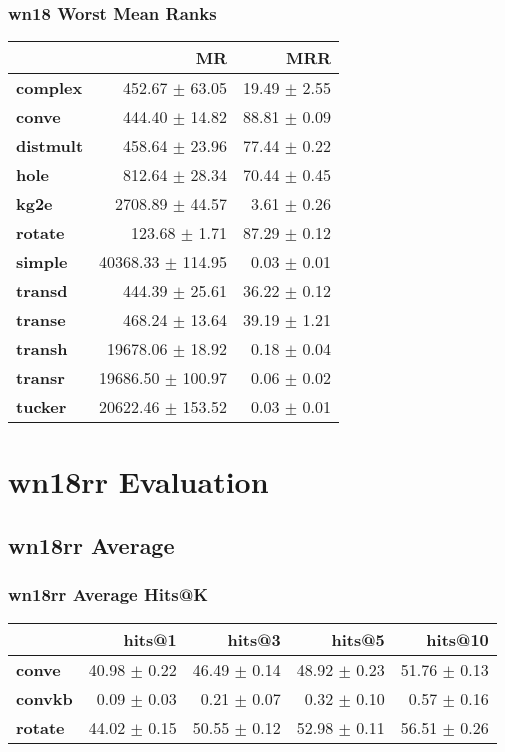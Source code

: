 \documentclass{article}
\begin{document}
\subsubsection{wn18 Worst Mean Ranks}
    \begin{center}
    \begin{tabular}{lrr}
\toprule
{} &                 MR &           MRR \\
\midrule
\textbf{complex } &     452.67 $\pm$ 63.05 &  19.49 $\pm$ 2.55 \\
\textbf{conve   } &     444.40 $\pm$ 14.82 &  88.81 $\pm$ 0.09 \\
\textbf{distmult} &     458.64 $\pm$ 23.96 &  77.44 $\pm$ 0.22 \\
\textbf{hole    } &     812.64 $\pm$ 28.34 &  70.44 $\pm$ 0.45 \\
\textbf{kg2e    } &    2708.89 $\pm$ 44.57 &   3.61 $\pm$ 0.26 \\
\textbf{rotate  } &      123.68 $\pm$ 1.71 &  87.29 $\pm$ 0.12 \\
\textbf{simple  } &  40368.33 $\pm$ 114.95 &   0.03 $\pm$ 0.01 \\
\textbf{transd  } &     444.39 $\pm$ 25.61 &  36.22 $\pm$ 0.12 \\
\textbf{transe  } &     468.24 $\pm$ 13.64 &  39.19 $\pm$ 1.21 \\
\textbf{transh  } &   19678.06 $\pm$ 18.92 &   0.18 $\pm$ 0.04 \\
\textbf{transr  } &  19686.50 $\pm$ 100.97 &   0.06 $\pm$ 0.02 \\
\textbf{tucker  } &  20622.46 $\pm$ 153.52 &   0.03 $\pm$ 0.01 \\
\bottomrule
\end{tabular}

    \end{center}

\section{wn18rr Evaluation}
\subsection{wn18rr Average}
\subsubsection{wn18rr Average Hits@K}
    \begin{center}
    \begin{tabular}{lrrrr}
\toprule
{} &        hits@1 &        hits@3 &        hits@5 &       hits@10 \\
\midrule
\textbf{conve } &  40.98 $\pm$ 0.22 &  46.49 $\pm$ 0.14 &  48.92 $\pm$ 0.23 &  51.76 $\pm$ 0.13 \\
\textbf{convkb} &   0.09 $\pm$ 0.03 &   0.21 $\pm$ 0.07 &   0.32 $\pm$ 0.10 &   0.57 $\pm$ 0.16 \\
\textbf{rotate} &  44.02 $\pm$ 0.15 &  50.55 $\pm$ 0.12 &  52.98 $\pm$ 0.11 &  56.51 $\pm$ 0.26 \\
\bottomrule
\end{tabular}

    \end{center}
\end{document}
